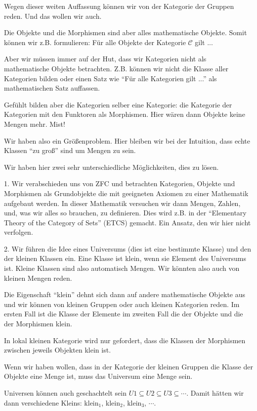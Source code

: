 \documentclass[a4paper]{amsart}
\theoremstyle{definition}
\newcommand{\CC}{\ensuremath{\mathcal{ C }}}
\begin{document}
Wegen dieser weiten Auffassung können wir von der Kategorie der Gruppen reden. Und das wollen wir auch.

Die Objekte und die Morphismen sind aber alles mathematische Objekte. Somit können wir z.B. formulieren: Für alle Objekte der Kategorie $\CC$ gilt ...

Aber wir müssen immer auf der Hut, dass wir Kategorien nicht als mathematische Objekte betrachten. Z.B. können wir nicht die Klasse aller Kategorien bilden oder einen Satz wie "`Für alle Kategorien gilt ..."' als mathematischen Satz auffassen.

Gefühlt bilden aber die Kategorien selber eine Kategorie: die Kategorie der Kategorien mit den Funktoren als Morphismen. Hier wären dann Objekte keine Mengen mehr. Mist!

Wir haben also ein Größenproblem. Hier bleiben wir bei der Intuition, dass echte Klassen "`zu groß"' sind um Mengen zu sein.

Wir haben hier zwei sehr unterschiedliche Möglichkeiten, dies zu lösen.

1. Wir verabschieden uns von ZFC und betrachten Kategorien, Objekte und Morphismen als Grundobjekte die mit geeigneten Axiomen zu einer Mathematik aufgebaut werden. In dieser Mathematik versuchen wir dann Mengen, Zahlen, und, was wir alles so brauchen, zu definieren. Dies wird z.B. in der "`Elementary Theory of the Category of Sets"' (ETCS) gemacht. Ein Ansatz, den wir hier nicht verfolgen.

2. Wir führen die Idee eines Universums (dies ist eine bestimmte Klasse) und den der kleinen Klassen ein. Eine Klasse ist klein, wenn sie Element des Universums ist. Kleine Klassen sind also automatisch Mengen. Wir könnten also auch von kleinen Mengen reden.

Die Eigenschaft "`klein"' dehnt sich dann auf andere mathematische Objekte aus und wir können von kleinen Gruppen oder auch kleinen Kategorien reden. Im ersten Fall ist die Klasse der Elemente im zweiten Fall die der Objekte und die der Morphismen klein.

In lokal kleinen Kategorie wird nur gefordert, dass die Klassen der Morphismen zwischen jeweils Objekten klein ist.

Wenn wir haben wollen, dass in der Kategorie der kleinen Gruppen die Klasse der Objekte eine Menge ist, muss das Universum eine Menge sein.

Universen können auch geschachtelt sein $U1 \subseteq U2 \subseteq U3 \subseteq \cdots$. Damit hätten wir dann verschiedene Kleins: klein$_1$, klein$_2$, klein$_3$, $\cdots$.
\end{document}
